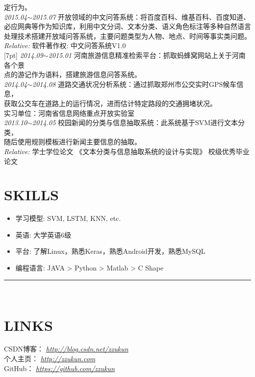\documentclass[line, margin]{res}
\newcommand{\xiaowu}{\fontsize{9pt}{15.75pt}\selectfont} %
\begin{document}
\begin{resume}
{{ 定行为。}\\
[7pt]
 {\sl 2015.04$\sim$2015.07} 开放领域的中文问答系统：{ 将百度百科、维基百科、百度知道、\\
 必应网典等作为知识库，利用中文分词、文本分类、语义角色标注等多种自然语言\\
 处理技术搭建开放域问答系统，主要问题类型为人物、地点、时间等事实类问题。}\\ 
 {\sl Relative:} {\xiaowu 软件著作权: 中文问答系统V1.0} \\
[7pt]
 {\sl 2014.09$\sim$2015.01} 河南旅游信息精准检索平台：{ 抓取蚂蜂窝网站上关于河南各个景\\
 点的游记作为语料，搭建旅游信息问答系统。} \\
[7pt]
 {\sl 2014.04$\sim$2014.08} 道路交通状况分析系统：{ 通过抓取郑州市公交实时GPS候车信息，\\
 获取公交车在道路上的运行情况，进而估计特定路段的交通拥堵状况。 \\
 实习单位：河南省信息网络重点开放实验室} \\
[7pt]
 {\sl 2013.10$\sim$2014.05} 校园新闻的分类与信息抽取系统：{ 此系统基于SVM进行文本分类，\\
 随后使用规则模板进行新闻主要信息的抽取。}\\
   {\sl Relative:} {\xiaowu 学士学位论文 《文本分类与信息抽取系统的设计与实现》 校级优秀毕业论文}} \\
 
\section{SKILLS}
\begin{itemize}
\item { 学习模型: }SVM, LSTM, KNN, etc.
\item { 英语: 大学英语6级}
\item { 平台: 了解Linux，熟悉Keras，熟悉Android开发，熟悉MySQL}
\item { 编程语言: }JAVA > Python > Matlab > C Shape
\end{itemize}

\rule{13.0cm}{0.05em} \\


\vspace {30pt}
\section {LINKS}
{ CSDN博客：} {\sl \url{http://blog.csdn.net/zzukun}}\\
[3pt]
{ 个人主页：} {\sl \url{http://zzukun.com}}\\
[3pt]
{ GitHub：  } {\sl \url{https://github.com/zzukun}}\\

\end{resume}
\end{document}
